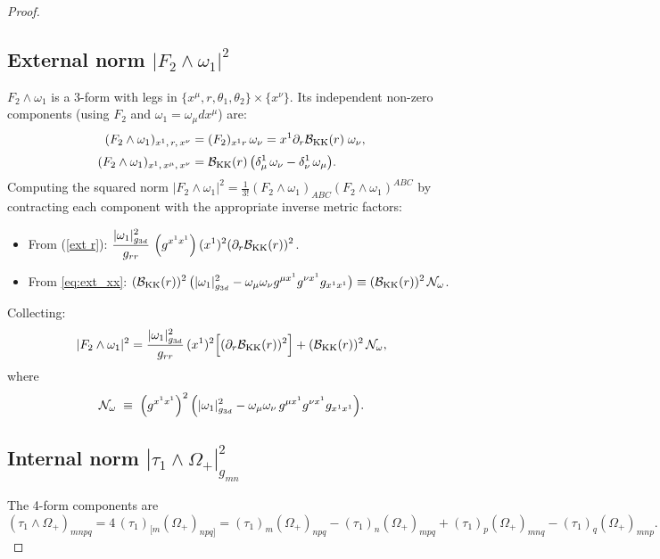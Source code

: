 \documentclass[a4paper,11pt,fleqn]{article}
\theoremstyle{plain}
\theoremstyle{definition}
\newcommand{\ta}{\tau}
\newcommand{\Nf}{{\cal B}_{\rm KK}(r)}
\newcommand{\gthree}{g_{3d}}
\newcommand{\grr}{g_{rr}}
\begin{document}
\begin{proof}
\subsection*{External norm $|F_2\wedge\omega_1|^2$}

$F_2\wedge\omega_1$ is a 3-form with legs in
$\{x^\mu,r,\theta_1,\theta_2\}\times\{x^\nu\}$.
Its independent non-zero components (using $F_2$  and
$\omega_1=\omega_\mu dx^\mu$) are:
\begin{align}
  (F_2\wedge\omega_1)_{x^1,\,r,\,x^\nu}
    &= (F_2)_{x^1 r}\,\omega_\nu
     = x^1\partial_r\Nf\;\omega_\nu,
  \label{ext r}\\[2pt]
  (F_2\wedge\omega_1)_{x^1,\,x^\mu,\,x^\nu}
    &= \Nf\,\bigl(\delta^1_\mu\,\omega_\nu - \delta^1_\nu\,\omega_\mu\bigr).
  \label{eq:ext_xx}
\end{align}
Computing the squared norm
$|F_2\wedge\omega_1|^2
= \frac{1}{3!}(F_2\wedge\omega_1)_{ABC}(F_2\wedge\omega_1)^{ABC}$
by contracting each component with the appropriate inverse metric factors:
\begin{itemize}
  \item From (\ref{ext r}):
    $\displaystyle
      \frac{|\omega_1|^2_{g_{3d}}}{\grr}\,\left(g^{x^1x^1}\right)(x^1)^2(\partial_r\Nf)^2$.
  \item From \eqref{eq:ext_xx}:
    $\displaystyle
      (\Nf)^2\,\bigl(|\omega_1|^2_{\gthree}
-\omega_\mu\omega_\nu g^{\mu x^1}g^{\nu x^1}g_{x^1x^1}\bigr)
      \equiv (\Nf)^2\,\mathcal{N}_\omega$.
\end{itemize}
Collecting:
\[
  |F_2\wedge\omega_1|^2
  =
  \frac{|\omega_1|^2_{g_{3d}}}{\grr}\,(x^1)^2
  \Bigl[
    (\partial_r\Nf)^2  \Bigr]
  + (\Nf)^2\,\mathcal{N}_\omega,
\]
where
\[
  \mathcal{N}_\omega
  \;\equiv\;
  \left(g^{x^1x^1}\right)^2\Bigl(
    |\omega_1|^2_{g_{3d}}
    - \omega_\mu\omega_\nu\,g^{\mu x^1}g^{\nu x^1}g_{x^1x^1}
  \Bigr).
\]

\subsection*{Internal norm $|\ta_1\wedge\Omega_+|^2_{g_{mn}}$}

The 4-form components are
\[
  (\ta_1\wedge\Omega_+)_{mnpq}
  = 4\,(\ta_1)_{[m}(\Omega_+)_{npq]}
  = (\ta_1)_m(\Omega_+)_{npq}
    - (\ta_1)_n(\Omega_+)_{mpq}
    + (\ta_1)_p(\Omega_+)_{mnq}
    - (\ta_1)_q(\Omega_+)_{mnp}.
\]




\end{proof}
\end{document}
